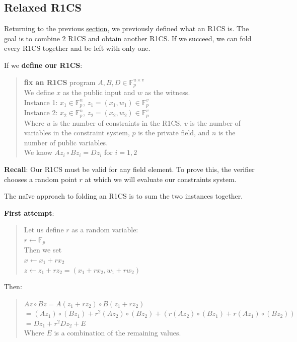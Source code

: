 \subsection{Relaxed R1CS}
Returning to the previous \hyperref[subsec:r1cs]{section}, we previously defined what an R1CS is.
The goal is to combine 2 R1CS and obtain another R1CS. If we succeed, we can fold every R1CS together and be left with only one.


If we \textbf{define our R1CS}:
\begin{quote}
\textbf{fix an R1CS} program $A,B,D \in \mathbb{F}^{u \times v}_p $
\\
We define $x$ as the public input and $w$ as the witness.
\\
Instance 1: $ x_1 \in \mathbb{F}^n_p $, $ z_1 = (x_1, w_1) \in \mathbb{F}^v_p$
\\
Instance 2: $x_2 \in \mathbb{F}^n_p $, $ z_2 = (x_2, w_2) \in \mathbb{F}^v_p$
\\
Where $u$ is the number of constraints in the R1CS, $v$ is the number of variables in the constraint system, $p$ is the private field, and $n$ is the number of public variables.
\\
We know $Az_i \circ Bz_i = Dz_i$ for $ i = 1,2$
\end{quote}


\textbf{Recall}: Our R1CS must be valid for any field element.
To prove this, the verifier chooses a random point $r$ at which we will evaluate our constraints system.

The naïve approach to folding an R1CS is to sum the two instances together.

\textbf{First attempt}:
\begin{quote}
Let us define $r$ as a random variable:
\\
$r \leftarrow \mathbb{F}_p$
\\
Then we set 
\\
$x \leftarrow x_1+rx_2$
\\
$z \leftarrow z_1 + rz_2 = (x_1+rx_2, w_1 + rw_2)$
\end{quote}


Then:
\begin{quote}
   $Az \circ Bz = A(z_1 + r z_2) \circ B(z_1 + rz_2)$
   \\
   $= (Az_1) \circ (Bz_1) + r^2 (Az_2) \circ (Bz_2) + (r(Az_2) \circ (Bz_1) + r(Az_1) \circ (Bz_2))$
   \\
   $=Dz_1 + r^2Dz_2 + E$
   \\
 Where $E$ is a combination of the remaining values.
   \\
\end{quote}

